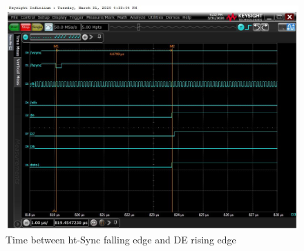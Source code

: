 \begin{figure}[h!]
\begin{center}
    \includegraphics[width=14cm]{pictures/lcd_timings/hsync_falling_de_rising.jpg}
\end{center}
\caption{Time between ht-Sync falling edge and DE rising edge}
\label{fig:hsync_de}
\end{figure}


